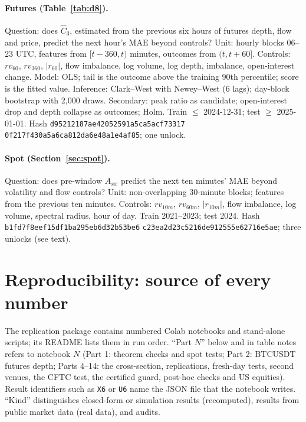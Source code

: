 \paragraph{Futures (Table~\ref{tab:d8}).} Question: does $\hat C_3$, estimated from the previous six hours of futures depth, flow and price, predict the next hour's MAE beyond controls? Unit: hourly blocks 06--23 UTC, features from $[t-360,t)$ minutes, outcomes from $(t,t+60]$. Controls: $rv_{60}$, $rv_{360}$, $|r_{60}|$, flow imbalance, log volume, log depth, imbalance, open-interest change. Model: OLS; tail is the outcome above the training 90th percentile; score is the fitted value. Inference: Clark--West with Newey--West (6 lags); day-block bootstrap with 2,000 draws. Secondary: peak ratio as candidate; open-interest drop and depth collapse as outcomes; Holm. Train $\le$ 2024-12-31; test $\ge$ 2025-01-01. Hash \texttt{d95212187ae42052591a5ca5acf73317} \texttt{0f217f430a5a6ca812da6e48a1e4af85}; one unlock.

\paragraph{Spot (Section~\ref{sec:spot}).} Question: does pre-window $A_{xx}$ predict the next ten minutes' MAE beyond volatility and flow controls? Unit: non-overlapping 30-minute blocks; features from the previous ten minutes. Controls: $rv_{10m}$, $rv_{60m}$, $|r_{10m}|$, flow imbalance, log volume, spectral radius, hour of day. Train 2021--2023; test 2024. Hash \texttt{b1fd7f8eef15df1ba295eb6d32b53be6} \texttt{c23ea2d23c5216de912555e62716e5ae}; three unlocks (see text).

\section{Reproducibility: source of every number}\label{app:repro}

The replication package contains numbered Colab notebooks and stand-alone scripts; its README lists them in run order. ``Part $N$'' below and in table notes refers to notebook $N$ (Part 1: theorem checks and spot tests; Part 2: BTCUSDT futures depth; Parts 4--14: the cross-section, replications, fresh-day tests, second venues, the CFTC test, the certified guard, post-hoc checks and US equities). Result identifiers such as \texttt{X6} or \texttt{U6} name the JSON file that the notebook writes. ``Kind'' distinguishes closed-form or simulation results (recomputed), results from public market data (real data), and audits.

